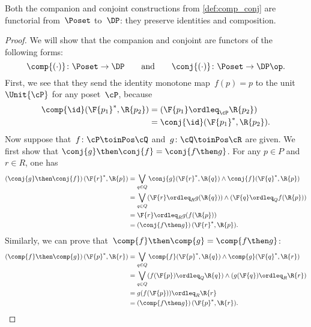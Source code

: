 \begin{lemma}
\label{prop:comp_conj}
Both the companion and conjoint constructions from \cref{def:comp_conj} are functorial from~$\Poset$ to~$\DP$: they preserve identities and composition.
\end{lemma}
\begin{proof}
We will show that the companion and conjoint are functors of the following forms:
\begin{equation}
\comp{(\cdot)}\colon\Poset\to\DP
\qquad\text{and}\qquad
\conj{(\cdot)}\colon\Poset\to\DP\op.
\end{equation}
First, we see that they send the identity monotone map~$f(p)=p$ to the unit~$\Unit{\cP }$ for any poset~$\cP $, because 
\begin{equation}
    \begin{aligned}
        \comp{\id}(\F{p_1}^*,\R{p_2})&= (\F{p_1} \ordleq_{\cP} \R{p_2})\\
        &=\conj{\id}(\F{p_1}^*,\R{p_2}).
    \end{aligned}
\end{equation}
Now suppose that~$f\colon  \cP \toinPos \cQ $ and~$g\colon \cQ \toinPos \cR$ are given. We first show that $\conj{g}\then\conj{f}=\conj{f\then g}$.
For any $p\in P$ and $r\in R$, one has
\begin{equation}
\begin{aligned}
	\left(\conj{g}\then \conj{f}\right)(\F{r}^*,\R{p})
	&=\bigvee_{q\in Q} \conj{g}(\F{r}^*,\R{q})\wedge\conj{f}(\F{q}^*,\R{p})\\
	&=\bigvee_{q\in Q} (\F{r}\ordleq_R g(\R{q})) \wedge (\F{q}\ordleq_Q f(\R{p})) \\
	&= \F{r}\ordleq_R g(f(\R{p}))\\
    &=\left(\conj{f\then g}\right)(\F{r}^*,\R{p}).
\end{aligned}
\end{equation}
Similarly, we can prove that~$\comp{f}\then \comp{g}=\comp{f\then g}$:
\begin{equation}
    \begin{aligned}
    \left(\comp{f}\then \comp{g}\right)(\F{p}^*,\R{r})&=\bigvee_{q\in Q} \comp{f}(\F{p}^*,\R{q})\wedge\comp{g}(\F{q}^*,\R{r})\\
    &=\bigvee_{q\in Q} (f(\F{p})\ordleq_Q \R{q})\wedge (g(\F{q})\ordleq_R \R{r})\\
    &=g(f(\F{p}))\ordleq_R \R{r}\\
    &=\left(\comp{f\then g}\right)(\F{p}^*,\R{r}).
    \end{aligned}
\end{equation}
\end{proof}

